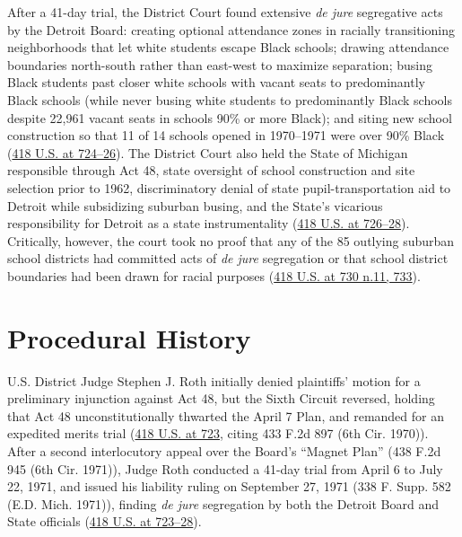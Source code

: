\documentclass[12pt]{article}
\begin{document}
After a 41-day trial, the District Court found extensive \textit{de jure} segregative acts by the Detroit Board: creating optional attendance zones in racially transitioning neighborhoods that let white students escape Black schools; drawing attendance boundaries north-south rather than east-west to maximize separation; busing Black students past closer white schools with vacant seats to predominantly Black schools (while never busing white students to predominantly Black schools despite 22,961 vacant seats in schools 90\% or more Black); and siting new school construction so that 11 of 14 schools opened in 1970--1971 were over 90\% Black (\href{https://supreme.justia.com/cases/federal/us/418/717/}{418 U.S. at 724--26}). The District Court also held the State of Michigan responsible through Act 48, state oversight of school construction and site selection prior to 1962, discriminatory denial of state pupil-transportation aid to Detroit while subsidizing suburban busing, and the State's vicarious responsibility for Detroit as a state instrumentality (\href{https://supreme.justia.com/cases/federal/us/418/717/}{418 U.S. at 726--28}). Critically, however, the court took no proof that any of the 85 outlying suburban school districts had committed acts of \textit{de jure} segregation or that school district boundaries had been drawn for racial purposes (\href{https://supreme.justia.com/cases/federal/us/418/717/}{418 U.S. at 730 n.11, 733}).

\section{Procedural History}
U.S. District Judge Stephen J. Roth initially denied plaintiffs' motion for a preliminary injunction against Act 48, but the Sixth Circuit reversed, holding that Act 48 unconstitutionally thwarted the April 7 Plan, and remanded for an expedited merits trial (\href{https://supreme.justia.com/cases/federal/us/418/717/}{418 U.S. at 723}, citing 433 F.2d 897 (6th Cir. 1970)). After a second interlocutory appeal over the Board's ``Magnet Plan'' (438 F.2d 945 (6th Cir. 1971)), Judge Roth conducted a 41-day trial from April 6 to July 22, 1971, and issued his liability ruling on September 27, 1971 (338 F. Supp. 582 (E.D. Mich. 1971)), finding \textit{de jure} segregation by both the Detroit Board and State officials (\href{https://supreme.justia.com/cases/federal/us/418/717/}{418 U.S. at 723--28}).
\end{document}
